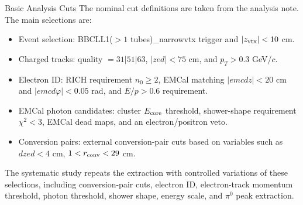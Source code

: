 \documentclass[10pt, dvipsnames]{beamer}
\begin{document}
\begin{frame}{Basic Analysis Cuts}
   \small
   The nominal cut definitions are taken from the analysis note.  The main selections are:
   \begin{itemize}
      \item Event selection: BBCLL1($>1$ tubes)\_narrowvtx trigger and $|z_{\rm vtx}|<10$ cm.
      \item Charged tracks: quality $=31|51|63$, $|zed|<75$ cm, and $p_T>0.3$ GeV/$c$.
      \item Electron ID: RICH requirement $n_0\geq 2$, EMCal matching $|emcdz|<20$ cm and $|emcd\varphi|<0.05$ rad, and $E/p>0.6$ requirement.
      \item EMCal photon candidates: cluster $E_{\rm core}$ threshold, shower-shape requirement $\chi^2<3$, EMCal dead maps, and an electron/positron veto.
      \item Conversion pairs: external conversion-pair cuts based on variables such as $dzed<4$ cm, $1<r_{\rm conv}<29$ cm.
   \end{itemize}
   \vspace{0.4em}
   The systematic study repeats the extraction with controlled variations of these selections, including conversion-pair cuts, electron ID, electron-track momentum threshold, photon threshold, shower shape, energy scale, and $\pi^0$ peak extraction.
\end{frame}
\end{document}
